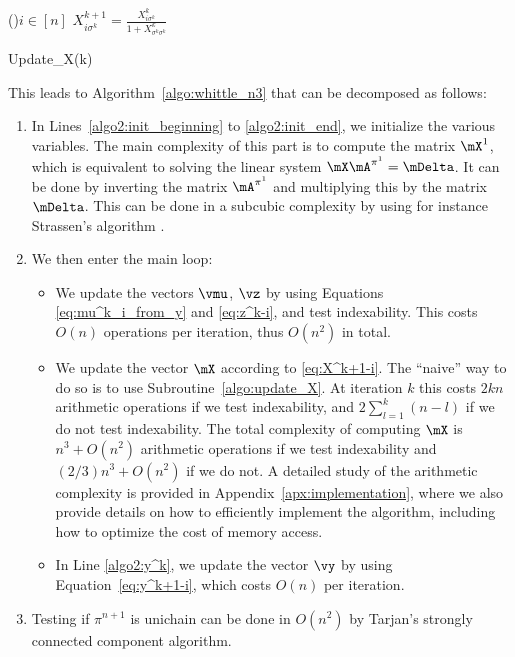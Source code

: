 \begin{subroutine}[ht]
    \newcommand{\LineComment}[1]{\hfill\textit{\% #1}}
    \For(){$i\in[n]$}{
        $X_{i\sigma^{k}}^{k+1} = \displaystyle\frac{X^{k}_{i\sigma^{k}}}{1+X^{k}_{\sigma^{k}\sigma^{k}}}$
    }
    \caption{Update\_X(k)}
    \label{algo:update_X}
\end{subroutine}

This leads to Algorithm~\ref{algo:whittle_n3} that can be decomposed as follows:
\begin{enumerate}
    \item In Lines~\ref{algo2:init_beginning} to \ref{algo2:init_end}, we initialize the various variables. The main complexity of this part is to compute the matrix $\mX^1$, which is equivalent to solving the linear system $\mX\mA^{\pi^1}=\mDelta$. It can be done by inverting the matrix $\mA^{\pi^1}$ and multiplying this by the matrix $\mDelta$. This can be done in a subcubic complexity by using for instance Strassen's algorithm \cite{strassen1969gaussian}.
    \item We then enter the main loop:
        \begin{itemize}
            \item We update the vectors $\vmu$, $\vz$ by using Equations \eqref{eq:mu^k_i_from_y} and \eqref{eq:z^k-i}, and test indexability. This costs $O(n)$ operations per iteration, thus $O(n^2)$ in total.
            \item We update the vector $\mX$ according to \eqref{eq:X^k+1-i}. The ``naive'' way to do so is to use Subroutine~\ref{algo:update_X}. At iteration $k$ this costs $2kn$ arithmetic operations if we test indexability, and $2\sum_{l=1}^{k}(n-l)$ if we do not test indexability. The total complexity of computing $\mX$ is $n^3 +O(n^2)$ arithmetic operations if we test indexability and $(2/3)n^3 +O(n^2)$ if we do not.
              A detailed study of the arithmetic complexity is provided in Appendix~\ref{apx:implementation}, where we also provide details on how to efficiently implement the algorithm, including how to optimize the cost of memory access.
            \item In Line \ref{algo2:y^k}, we update the vector $\vy$ by using Equation~\eqref{eq:y^k+1-i}, which costs $O(n)$ per iteration. 
        \end{itemize}
    \item Testing if $\pi^{n+1}$ is unichain can be done in $O(n^2)$ by Tarjan's strongly connected component algorithm.
\end{enumerate}
